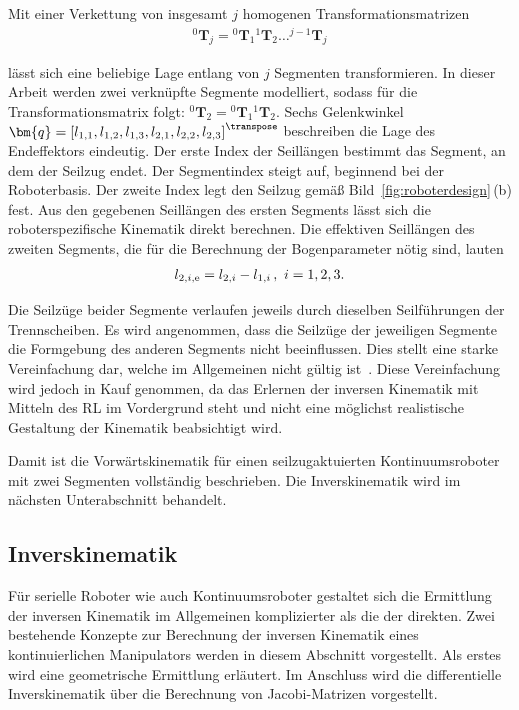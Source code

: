 Mit einer Verkettung von insgesamt $j$ homogenen Transformationsmatrizen
\begin{align}
{}^{0}\bm{T}_j = {}^{0}\bm{T}_{1} {}^1\bm{T}_{2} \dots {}^{j-1}\bm{T}_{j}
\end{align}

lässt sich eine beliebige Lage entlang von $j$ Segmenten transformieren. In dieser Arbeit werden zwei verknüpfte Segmente modelliert, sodass für die Transformationsmatrix folgt: ${}^{0}\bm{T}_2 = {}^{0}\bm{T}_{1} {}^1\bm{T}_{2}$. Sechs Gelenkwinkel 
$\bm{q} = \left[l_{1,1}, l_{1,2}, l_{1,3}, l_{2,1}, l_{2,2}, l_{2,3} \right]^\transpose$
beschreiben die Lage des Endeffektors eindeutig. 
Der erste Index der Seillängen bestimmt das Segment, an dem der Seilzug endet. Der Segmentindex steigt auf, beginnend bei der Roboterbasis. Der zweite Index legt den Seilzug gemäß Bild~\mbox{\ref{fig:roboterdesign}\,(b)} fest. Aus den gegebenen Seillängen des ersten Segments lässt sich die roboterspezifische Kinematik direkt berechnen. Die effektiven Seillängen des zweiten Segments, die für die Berechnung der Bogenparameter nötig sind, lauten
\begin{align}
l_{2,i,\mathrm{e}} = l_{2,i} - l_{1,i}\text{\,},~ i = 1,2,3.
\label{eq:effektive_laenge}
\end{align}

Die Seilzüge beider Segmente verlaufen jeweils durch dieselben Seilführungen der Trennscheiben. Es wird angenommen, dass die Seilzüge der jeweiligen Segmente die Formgebung des anderen Segments nicht beeinflussen. Dies stellt eine starke Vereinfachung dar, welche im Allgemeinen nicht gültig ist~\cite{WIJ10}. Diese Vereinfachung wird jedoch in Kauf genommen, da das Erlernen der inversen Kinematik mit Mitteln des RL im Vordergrund steht und nicht eine möglichst realistische Gestaltung der Kinematik beabsichtigt wird. \newline

Damit ist die Vorwärtskinematik für einen seilzugaktuierten Kontinuumsroboter mit zwei Segmenten vollständig beschrieben. Die Inverskinematik wird im nächsten Unterabschnitt behandelt.





\subsection{Inverskinematik}
\label{subesc:inverse_kinematik}

Für serielle Roboter wie auch Kontinuumsroboter gestaltet sich die Ermittlung der inversen Kinematik im Allgemeinen komplizierter als die der direkten. Zwei bestehende Konzepte zur Berechnung der inversen Kinematik eines kontinuierlichen Manipulators werden in diesem Abschnitt vorgestellt. Als erstes wird eine geometrische Ermittlung erläutert. Im Anschluss wird die differentielle Inverskinematik über die Berechnung von Jacobi-Matrizen vorgestellt. \newline

